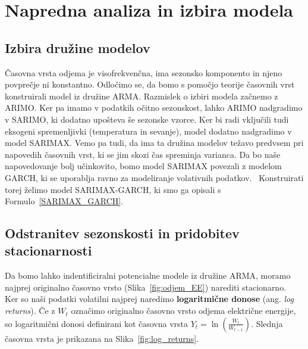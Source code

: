 \documentclass[a4paper, 11pt]{article}
\begin{document}


\section{Napredna analiza in izbira modela}

\subsection{Izbira družine modelov}

Časovna vrsta odjema je visofrekvenčna, ima sezonsko komponento in njeno povprečje ni konstantno.
Odločimo se, da bomo s pomočjo teorije časovnih vrst konstruirali model iz družine ARMA. 
Razmislek o izbiri modela začnemo z ARIMO. Ker pa imamo v podatkih očitno sezonskost, lahko ARIMO nadgradimo v SARIMO, 
ki dodatno
upošteva še sezonske vzorce. Ker bi radi vključili tudi eksogeni spremenljivki (temperatura in sevanje), model
dodatno nadgradimo v model SARIMAX.
Vemo pa tudi, da ima ta družina modelov težavo predvsem pri napovedih časovnih vrst, ki se jim  
skozi čas spreminja varianca. Da bo naše napovedovanje bolj učinkovito, bomo model SARIMAX povezali z modelom GARCH, 
ki se uporablja ravno za modeliranje volativnih podatkov.~\cite{ArimaGarch} Konstruirati torej želimo model
SARIMAX-GARCH, ki smo ga opisali s Formulo~\eqref{SARIMAX_GARCH}.



\subsection{Odstranitev sezonskosti in pridobitev stacionarnosti}

Da bomo lahko indentificiralni potencialne modele iz družine ARMA, moramo najprej 
originalno časovno vrsto (Slika~\ref{fig:odjem_EE})
narediti stacionarno. \\

\noindent Ker so naši podatki volatilni najprej naredimo \textbf{logaritmične donose} 
(ang. \emph{log returns}). Če z $W_t$ označimo originalno časovno vrsto odjema električne energije, so logaritmični donosi
definirani kot časovna vrsta $ Y_t = \ln \left( \frac{W_t}{W_{t-1}} \right) $. Slednja časovna vrsta je prikazana na
Slika~\ref{fig:log_returns}.
\end{document}
